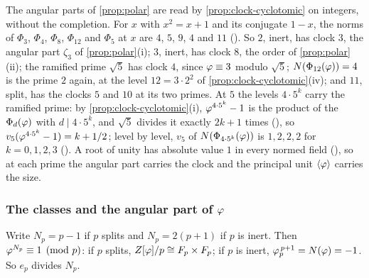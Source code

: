 \begin{remark}\label{rmk:angles-cyclotomic}
The angular parts of \cref{prop:polar} are read by \cref{prop:clock-cyclotomic} on integers,
without the completion.  For $x$ with $x^2=x+1$ and its conjugate $1-x$, the norms of
$\Phi_3$, $\Phi_4$, $\Phi_8$, $\Phi_{12}$ and $\Phi_5$ at $x$ are $4$, $5$, $9$, $4$ and $11$
().  So $2$, inert, has clock $3$,
the angular part $\zeta_3$ of \cref{prop:polar}(i); $3$, inert, has clock $8$, the order of
\cref{prop:polar}(ii); the ramified prime $\sqrt5$ has clock $4$, since $\varphi\equiv3$ modulo
$\sqrt5$; $N(\Phi_{12}(\varphi))=4$ is the prime $2$ again, at the level $12=3\cdot2^2$ of
\cref{prop:clock-cyclotomic}(iv); and $11$, split, has the clocks $5$ and $10$ at its two primes.
At $5$ the levels $4\cdot5^k$ carry the ramified prime: by
\cref{prop:clock-cyclotomic}(i), $\varphi^{4\cdot5^k}-1$ is the product of the $\Phi_d(\varphi)$
with $d\mid4\cdot5^k$, and $\sqrt5$ divides it exactly $2k+1$ times
(), so $v_5(\varphi^{4\cdot5^k}-1)=k+1/2$; level by level, $v_5$ of
$N(\Phi_{4\cdot5^k}(\varphi))$ is $1,2,2,2$ for $k=0,1,2,3$ ().  A root of unity has
absolute value $1$ in every normed field
(), so at each prime the angular part
carries the clock and the principal unit $\langle\varphi\rangle$ carries the size.
\end{remark}


\subsubsection{The classes and the angular part of $\varphi$}\label{ssec:classes-angular}

Write $N_p=p-1$ if $p$ splits and $N_p=2(p+1)$ if $p$ is inert.  Then $\varphi^{N_p}\equiv1\pmod p$: if $p$
splits, $Z[\varphi]/p\cong F_p\times F_p$; if $p$ is inert, $\varphi_p^{\,p+1}=N(\varphi)=-1$.  So $e_p$ divides $N_p$.


